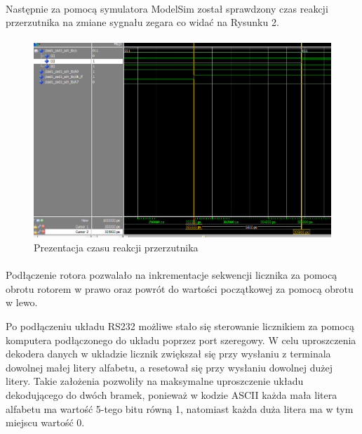 \documentclass[wide,a4paper,titlepage,12pt] {article}
\begin{document}
		\paragraph{}
		\paragraph{}

	Następnie za pomocą symulatora ModelSim został sprawdzony czas reakcji przerzutnika na zmiane sygnału zegara co widać na Rysunku 2.

		\paragraph{}

		\begin{figure}[htbp]
	 		\begin{center}
         \includegraphics[scale=0.4]{screen.png}
      \caption{Prezentacja czasu reakcji przerzutnika}
     \end{center}
  \end{figure}

  \paragraph{}
  Podłączenie rotora pozwalało na inkrementacje sekwencji licznika za pomocą obrotu rotorem w prawo oraz powrót do wartości początkowej za pomocą obrotu w lewo.

  Po podłączeniu układu RS232 możliwe stało się sterowanie licznikiem za pomocą komputera podłączonego do układu poprzez port szeregowy. W celu uproszczenia dekodera danych w układzie licznik zwiększał się przy wysłaniu z terminala dowolnej małej litery alfabetu, a resetował się przy wysłaniu dowolnej dużej litery. Takie założenia pozwoliły na maksymalne uproszczenie układu dekodującego do dwóch bramek, ponieważ w kodzie ASCII każda mała litera alfabetu ma wartość 5-tego bitu równą 1, natomiast każda duża litera ma w tym miejscu wartość 0.
\end{document}
